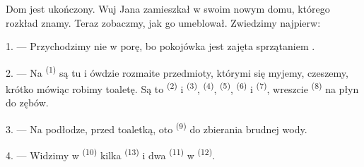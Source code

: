 %
%

\VUsaut{6.0mm}
\VUsaut{1.4mm}
\VUsaut{0.4mm}
\VUsaut{2.2mm}

Dom jest ukończony. Wuj Jana zamieszkał w swoim nowym domu, którego rozkład znamy. Teraz
zobaczmy, jak go umeblował. Zwiedzimy najpierw:

\VUsaut{3.0mm}

1. --- Przychodzimy nie w porę, bo pokojówka jest zajęta sprzątaniem .

2. --- Na  \textsuperscript{(1)} są tu i ówdzie rozmaite przedmioty,
którymi się myjemy, czeszemy, krótko mówiąc robimy toaletę. Są to 
\textsuperscript{(2)} i  \textsuperscript{(3)},
 \textsuperscript{(4)}, 
\textsuperscript{(5)},  \textsuperscript{(6)} i 
\textsuperscript{(7)}, wreszcie  \textsuperscript{(8)} na płyn do
zębów.

3. --- Na podłodze, przed toaletką, oto  \textsuperscript{(9)} do
zbierania brudnej wody.

4. --- Widzimy w  \textsuperscript{(10)} kilka 
\textsuperscript{(13)} i dwa  \textsuperscript{(11)} w  \textsuperscript{(12)}.


